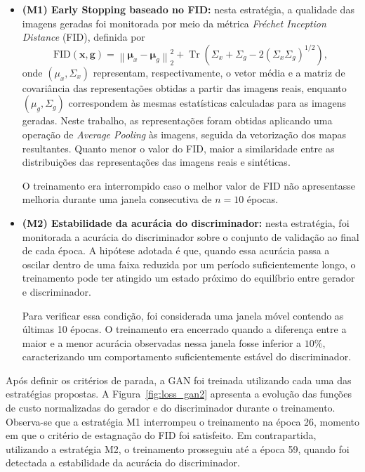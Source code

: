 \begin{itemize}
    \item \textbf{(M1) Early Stopping baseado no FID:} nesta estratégia, a qualidade das imagens geradas foi monitorada por meio da métrica \textit{Fréchet Inception Distance} (FID), definida por
    \begin{equation}
        \mathrm{FID}(\mathbf{x},\mathbf{g}) =
        \left\|\boldsymbol{\mu}_x-\boldsymbol{\mu}_g\right\|_2^2 +
        \operatorname{Tr}
        \left(
        \Sigma_x+\Sigma_g-
        2(\Sigma_x\Sigma_g)^{1/2}
        \right),
        \label{eq:fid}
    \end{equation}
    onde $(\mu_x,\Sigma_x)$ representam, respectivamente, o vetor média e a matriz de covariância das representações obtidas a partir das imagens reais, enquanto $(\mu_g,\Sigma_g)$ correspondem às mesmas estatísticas calculadas para as imagens geradas. Neste trabalho, as representações foram obtidas aplicando uma operação de \textit{Average Pooling} às imagens, seguida da vetorização dos mapas resultantes. Quanto menor o valor do FID, maior a similaridade entre as distribuições das representações das imagens reais e sintéticas.
    
    O treinamento era interrompido caso o melhor valor de FID não apresentasse melhoria durante uma janela consecutiva de $n=10$ épocas.

    \item \textbf{(M2) Estabilidade da acurácia do discriminador:} nesta estratégia, foi monitorada a acurácia do discriminador sobre o conjunto de validação ao final de cada época. A hipótese adotada é que, quando essa acurácia passa a oscilar dentro de uma faixa reduzida por um período suficientemente longo, o treinamento pode ter atingido um estado próximo do equilíbrio entre gerador e discriminador.

    Para verificar essa condição, foi considerada uma janela móvel contendo as últimas 10 épocas. O treinamento era encerrado quando a diferença entre a maior e a menor acurácia observadas nessa janela fosse inferior a $10\%$, caracterizando um comportamento suficientemente estável do discriminador.
\end{itemize}

Após definir os critérios de parada, a GAN foi treinada utilizando cada uma das estratégias propostas. A Figura~\ref{fig:loss_gan2} apresenta a evolução das funções de custo normalizadas do gerador e do discriminador durante o treinamento. Observa-se que a estratégia M1 interrompeu o treinamento na época 26, momento em que o critério de estagnação do FID foi satisfeito. Em contrapartida, utilizando a estratégia M2, o treinamento prosseguiu até a época 59, quando foi detectada a estabilidade da acurácia do discriminador.


